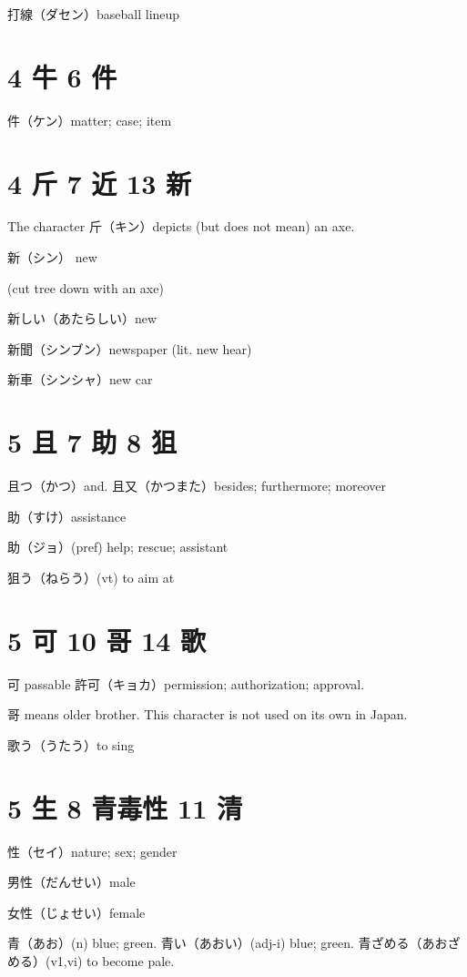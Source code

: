 打線（ダセン）baseball lineup

\section{4 牛 6 件}

件（ケン）matter; case; item

\section{4 斤 7 近 13 新}

The character 斤（キン）depicts (but does not mean) an axe.

新（シン） new

(cut tree down with an axe)

新しい（あたらしい）new

新聞（シンブン）newspaper (lit. new hear)

新車（シンシャ）new car

\section{5 且 7 助 8 狙}

且つ（かつ）and.
且又（かつまた）besides; furthermore; moreover

助（すけ）assistance

助（ジョ）(pref) help; rescue; assistant

狙う（ねらう）(vt) to aim at

\section{5 可 10 哥 14 歌}

可 passable
許可（キョカ）permission; authorization; approval.

哥 means older brother.
This character is not used on its own in Japan.

歌う（うたう）to sing

\section{5 生 8 青毒性 11 清}

性（セイ）nature; sex; gender

男性（だんせい）male

女性（じょせい）female

青（あお）(n) blue; green.
青い（あおい）(adj-i) blue; green.
青ざめる（あおざめる）(v1,vi) to become pale.

